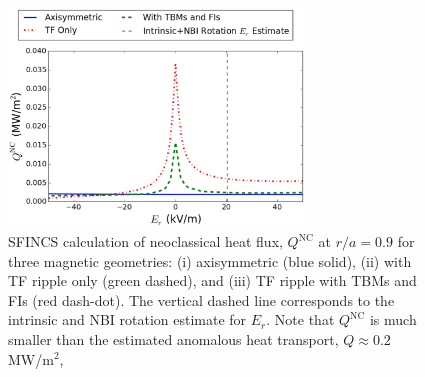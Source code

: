 \documentclass[aip, pop, preprint]{revtex4-1}
\numberwithin{figure}{section}
\numberwithin{equation}{section}
\begin{document}
\begin{figure}[h!]
\centering
\includegraphics[width=0.7\textwidth]{figure12.eps}
\caption{\label{fig:HeatFlux} SFINCS calculation of neoclassical heat flux, $Q^{\mathrm{NC}}$ at $r/a = 0.9$ for three magnetic geometries: (i) axisymmetric (blue solid), (ii) with TF ripple only (green dashed), and (iii) TF ripple with TBMs and FIs (red dash-dot). The vertical dashed line corresponds to the intrinsic and NBI rotation estimate for $E_r$. Note that $Q^{\mathrm{NC}}$ is much smaller than the estimated anomalous heat transport, $Q\approx 0.2$ MW/m$^2$,}
\end{figure}

\FloatBarrier
\end{document}
